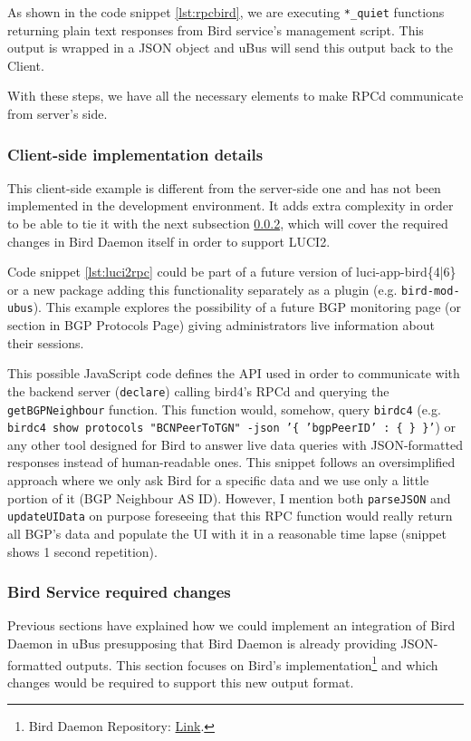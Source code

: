 As shown in the code snippet \ref{lst:rpcbird}, we are executing \texttt{*\_quiet} functions returning plain text responses from Bird service's management script. This output is wrapped in a JSON object and uBus will send this output back to the Client.

With these steps, we have all the necessary elements to make RPCd communicate from server's side.

\subsubsection{Client-side implementation details}

This client-side example is different from the server-side one and has not been implemented in the development environment. It adds extra complexity in order to be able to tie it with the next subsection \ref{sub:sub:birdex}, which will cover the required changes in Bird Daemon itself in order to support LUCI2.

Code snippet \ref{lst:luci2rpc} could be part of a future version of luci-app-bird\{4|6\} or a new package adding this functionality separately as a plugin (e.g. \texttt{bird-mod-ubus}). This example explores the possibility of a future BGP monitoring page (or section in BGP Protocols Page) giving administrators live information about their sessions.

 

This possible JavaScript code defines the API used in order to communicate with the backend server (\texttt{declare}) calling bird4's RPCd and querying the \texttt{getBGPNeighbour} function. This function would, somehow, query \texttt{birdc4} (e.g. \texttt{birdc4 show protocols "BCNPeerToTGN" -json '\{ 'bgpPeerID' : \{ \} \}'}) or any other tool designed for Bird to answer live data queries with JSON-formatted responses instead of human-readable ones.
This snippet follows an oversimplified approach where we only ask Bird for a specific data and we use only a little portion of it (BGP Neighbour AS ID). However, I mention both \texttt{parseJSON} and \texttt{updateUIData} on purpose foreseeing that this RPC function would really return all BGP's data and populate the UI with it in a reasonable time lapse (snippet shows 1 second repetition).

\subsubsection{Bird Service required changes}
\label{sub:sub:birdex}
Previous sections have explained how we could implement an integration of Bird Daemon in uBus presupposing that Bird Daemon is already providing JSON-formatted outputs.
This section focuses on Bird's implementation\footnote{Bird Daemon Repository: \href{https://gitlab.labs.nic.cz/labs/bird}{Link}.} and which changes would be required to support this new output format.

